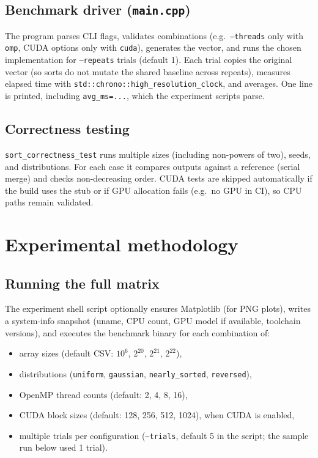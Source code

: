 \documentclass[11pt,a4paper]{article}
\begin{document}
\subsection{Benchmark driver (\texttt{main.cpp})}
The program parses CLI flags, validates combinations (e.g.\ \texttt{--threads} only with \texttt{omp}, CUDA options only with \texttt{cuda}), generates the vector, and runs the chosen implementation for \texttt{--repeats} trials (default 1). Each trial copies the original vector (so sorts do not mutate the shared baseline across repeats), measures elapsed time with \texttt{std::chrono::high\_resolution\_clock}, and averages. One line is printed, including \texttt{avg\_ms=...}, which the experiment scripts parse.

\subsection{Correctness testing}
\texttt{sort\_correctness\_test} runs multiple sizes (including non-powers of two), seeds, and distributions. For each case it compares outputs against a reference (serial merge) and checks non-decreasing order. CUDA tests are skipped automatically if the build uses the stub or if GPU allocation fails (e.g.\ no GPU in CI), so CPU paths remain validated.

\section{Experimental methodology}

\subsection{Running the full matrix}
The experiment shell script optionally ensures Matplotlib (for PNG plots), writes a system-info snapshot (uname, CPU count, GPU model if available, toolchain versions), and executes the benchmark binary for each combination of:
\begin{itemize}[noitemsep]
  \item array sizes (default CSV: $10^6$, $2^{20}$, $2^{21}$, $2^{22}$),
  \item distributions (\texttt{uniform}, \texttt{gaussian}, \texttt{nearly\_sorted}, \texttt{reversed}),
  \item OpenMP thread counts (default: 2, 4, 8, 16),
  \item CUDA block sizes (default: 128, 256, 512, 1024), when CUDA is enabled,
  \item multiple trials per configuration (\texttt{--trials}, default 5 in the script; the sample run below used 1 trial).
\end{itemize}
\end{document}
